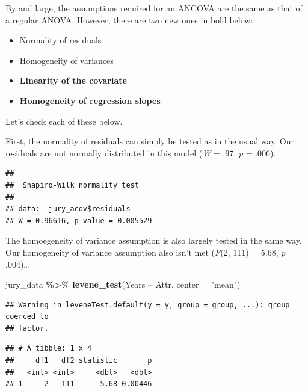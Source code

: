 \documentclass[
]{book}
\newenvironment{Shaded}{\begin{snugshade}}{\end{snugshade}}
\newcommand{\AttributeTok}[1]{\textcolor[rgb]{0.13,0.29,0.53}{#1}}
\newcommand{\FunctionTok}[1]{\textcolor[rgb]{0.13,0.29,0.53}{\textbf{#1}}}
\newcommand{\NormalTok}[1]{#1}
\newcommand{\SpecialCharTok}[1]{\textcolor[rgb]{0.81,0.36,0.00}{\textbf{#1}}}
\newcommand{\StringTok}[1]{\textcolor[rgb]{0.31,0.60,0.02}{#1}}
\providecommand{\tightlist}{%
  \setlength{\itemsep}{0pt}\setlength{\parskip}{0pt}}
\begin{document}
By and large, the assumptions required for an ANCOVA are the same as that of a regular ANOVA. However, there are two new ones in bold below:

\begin{itemize}
\tightlist
\item
  Normality of residuals
\item
  Homogeneity of variances
\item
  \textbf{Linearity of the covariate}
\item
  \textbf{Homogeneity of regression slopes}
\end{itemize}

Let's check each of these below.

First, the normality of residuals can simply be tested as in the usual way. Our residuals are not normally distributed in this model (\emph{W} = .97, \emph{p} = .006).

\begin{Shaded}
\end{Shaded}

\begin{verbatim}
## 
##  Shapiro-Wilk normality test
## 
## data:  jury_acov$residuals
## W = 0.96616, p-value = 0.005529
\end{verbatim}

The homoegeneity of variance assumption is also largely tested in the same way. Our homogeneity of variance assumption also isn't met (\emph{F}(2, 111) = 5.68, \emph{p} = .004)\ldots{}

\begin{Shaded}
\begin{Highlighting}[]
\NormalTok{jury\_data }\SpecialCharTok{\%\textgreater{}\%}
  \FunctionTok{levene\_test}\NormalTok{(Years }\SpecialCharTok{\textasciitilde{}}\NormalTok{ Attr, }\AttributeTok{center =} \StringTok{"mean"}\NormalTok{)}
\end{Highlighting}
\end{Shaded}

\begin{verbatim}
## Warning in leveneTest.default(y = y, group = group, ...): group coerced to
## factor.
\end{verbatim}

\begin{verbatim}
## # A tibble: 1 x 4
##     df1   df2 statistic       p
##   <int> <int>     <dbl>   <dbl>
## 1     2   111      5.68 0.00446
\end{verbatim}
\end{document}
